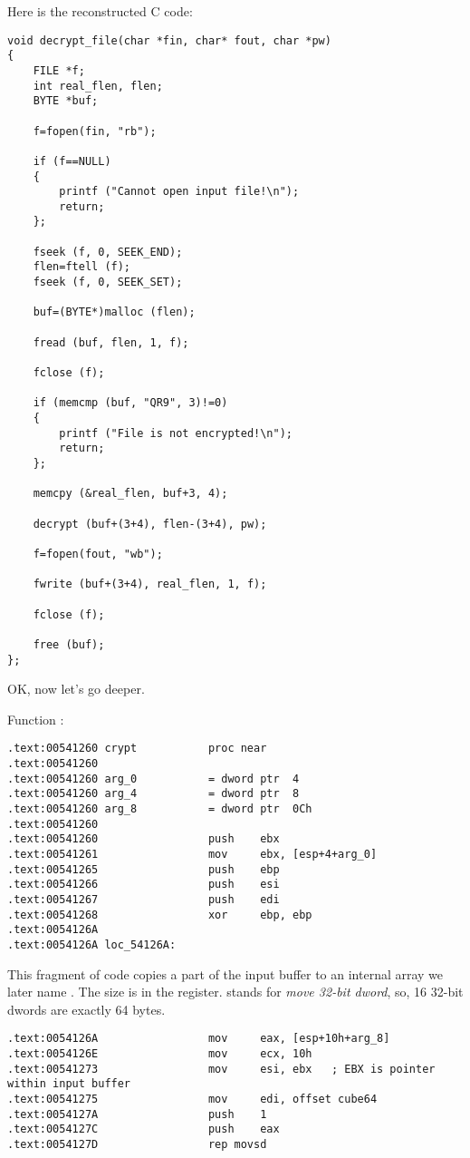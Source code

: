 Here is the reconstructed C code:

\begin{lstlisting}[style=customc]
void decrypt_file(char *fin, char* fout, char *pw)
{
	FILE *f;
	int real_flen, flen;
	BYTE *buf;

	f=fopen(fin, "rb");
	
	if (f==NULL)
	{
		printf ("Cannot open input file!\n");
		return;
	};

	fseek (f, 0, SEEK_END);
	flen=ftell (f);
	fseek (f, 0, SEEK_SET);

	buf=(BYTE*)malloc (flen);

	fread (buf, flen, 1, f);

	fclose (f);

	if (memcmp (buf, "QR9", 3)!=0)
	{
		printf ("File is not encrypted!\n");
		return;
	};

	memcpy (&real_flen, buf+3, 4);

	decrypt (buf+(3+4), flen-(3+4), pw);
	
	f=fopen(fout, "wb");

	fwrite (buf+(3+4), real_flen, 1, f);

	fclose (f);

	free (buf);
};
\end{lstlisting}

OK, now let's go deeper.

Function :

\begin{lstlisting}[style=customasmx86]
.text:00541260 crypt           proc near
.text:00541260
.text:00541260 arg_0           = dword ptr  4
.text:00541260 arg_4           = dword ptr  8
.text:00541260 arg_8           = dword ptr  0Ch
.text:00541260
.text:00541260                 push    ebx
.text:00541261                 mov     ebx, [esp+4+arg_0]
.text:00541265                 push    ebp
.text:00541266                 push    esi
.text:00541267                 push    edi
.text:00541268                 xor     ebp, ebp
.text:0054126A
.text:0054126A loc_54126A:
\end{lstlisting}

This fragment of code copies a part of the input buffer to an internal array we later name .
The size is in the \ECX register.  stands for \emph{move 32-bit dword}, so, 
16 32-bit dwords are exactly 64 bytes.

\begin{lstlisting}[style=customasmx86]
.text:0054126A                 mov     eax, [esp+10h+arg_8]
.text:0054126E                 mov     ecx, 10h
.text:00541273                 mov     esi, ebx   ; EBX is pointer within input buffer
.text:00541275                 mov     edi, offset cube64
.text:0054127A                 push    1
.text:0054127C                 push    eax
.text:0054127D                 rep movsd
\end{lstlisting}

